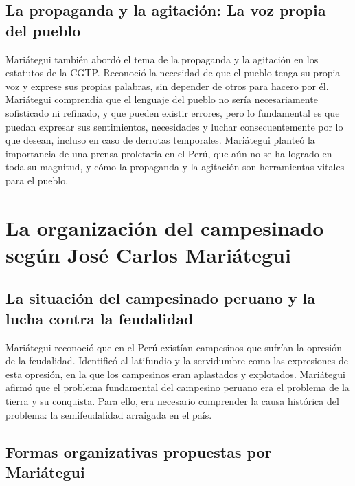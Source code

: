\documentclass[
  a4paper,
]{article}
\begin{document}
\hypertarget{la-propaganda-y-la-agitaciuxf3n-la-voz-propia-del-pueblo}{%
\subsection{La propaganda y la agitación: La voz propia del
pueblo}\label{la-propaganda-y-la-agitaciuxf3n-la-voz-propia-del-pueblo}}

Mariátegui también abordó el tema de la propaganda y la agitación en los
estatutos de la CGTP. Reconoció la necesidad de que el pueblo tenga su
propia voz y exprese sus propias palabras, sin depender de otros para
hacero por él. Mariátegui comprendía que el lenguaje del pueblo no sería
necesariamente sofisticado ni refinado, y que pueden existir errores,
pero lo fundamental es que puedan expresar sus sentimientos, necesidades
y luchar consecuentemente por lo que desean, incluso en caso de derrotas
temporales. Mariátegui planteó la importancia de una prensa proletaria
en el Perú, que aún no se ha logrado en toda su magnitud, y cómo la
propaganda y la agitación son herramientas vitales para el pueblo.

\hypertarget{la-organizaciuxf3n-del-campesinado-seguxfan-josuxe9-carlos-mariuxe1tegui}{%
\section{La organización del campesinado según José Carlos
Mariátegui}\label{la-organizaciuxf3n-del-campesinado-seguxfan-josuxe9-carlos-mariuxe1tegui}}

\hypertarget{la-situaciuxf3n-del-campesinado-peruano-y-la-lucha-contra-la-feudalidad}{%
\subsection{La situación del campesinado peruano y la lucha contra la
feudalidad}\label{la-situaciuxf3n-del-campesinado-peruano-y-la-lucha-contra-la-feudalidad}}

Mariátegui reconoció que en el Perú existían campesinos que sufrían la
opresión de la feudalidad. Identificó al latifundio y la servidumbre
como las expresiones de esta opresión, en la que los campesinos eran
aplastados y explotados. Mariátegui afirmó que el problema fundamental
del campesino peruano era el problema de la tierra y su conquista. Para
ello, era necesario comprender la causa histórica del problema: la
semifeudalidad arraigada en el país.

\hypertarget{formas-organizativas-propuestas-por-mariuxe1tegui}{%
\subsection{Formas organizativas propuestas por
Mariátegui}\label{formas-organizativas-propuestas-por-mariuxe1tegui}}
\end{document}
